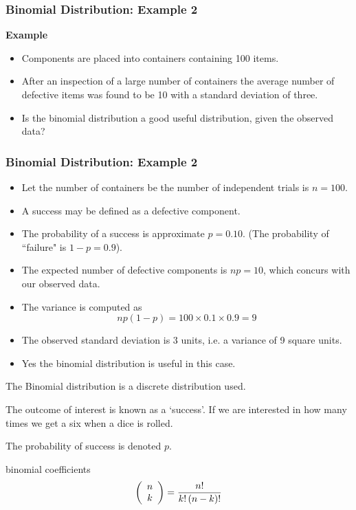 \begin{frame}
	\frametitle{Binomial Distribution: Example 2}
	\textbf{Example}
	\begin{itemize}
		\item Components are placed into containers containing 100 items.
		\item After an inspection of a large number of containers the average number of defective items was found to be 10 with a standard deviation of three.
		\item Is the binomial distribution a good useful distribution, given the observed data?
	\end{itemize}
\end{frame}
\begin{frame}
	\frametitle{Binomial Distribution: Example 2}
	
	\begin{itemize}
		\item Let the number of containers be the number of independent trials is $n=100$.
		\item A success may be defined as a defective component.
		\item The probability of a success is approximate $p=0.10$. (The probability of ``failure" is $1-p=0.9$).
		\item The expected number of defective components is $np=10$, which concurs with our observed data.
		\item The variance is computed as \[np(1-p) = 100 \times 0.1 \times 0.9 = 9\]
		\item The observed standard deviation is 3 units, i.e. a variance of 9 square units.
		\item Yes the binomial distribution is useful in this case.
	\end{itemize}
\end{frame}
\begin{frame}
	The Binomial distribution is a discrete distribution used.


The outcome of interest is known as a `success'. If we are
interested in how many times we get a six when a dice is rolled.

The probability of success is denoted $p$.

binomial coefficients
\[
\left( {\begin{array}{*{20}c} n \\ k \\ \end{array}} \right) =
\frac{{n!}}{{k!\left( {n - k} \right)!}} \]
\end{frame}

